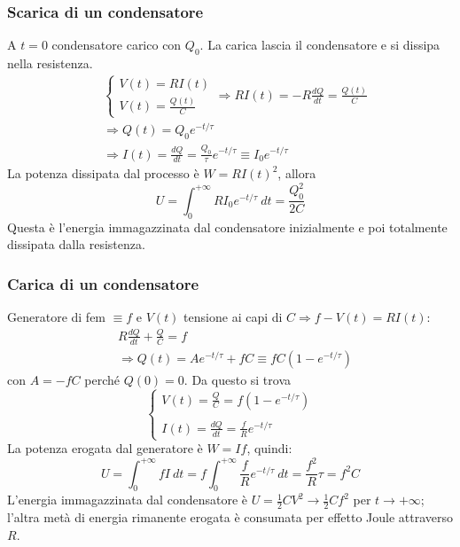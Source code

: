 \documentclass[10pt, a4paper]{scrartcl}
\numberwithin{equation}{subsection}
\theoremstyle{style1}
\begin{document}
\subsubsection{Scarica di un condensatore}
A $t=0$ condensatore carico con $Q_0$. La carica lascia il condensatore e si dissipa nella resistenza. 
\begin{equation}
	\begin{split}
		&\begin{cases}
		V(t) = RI(t) \\
		V(t) = \frac{Q(t)}{C} 
	\end{cases}\Rightarrow RI(t) = - R \frac{d Q}{d t} = \frac{Q(t)}{C}\\
		&\Rightarrow Q(t) = Q_0 e^{ - t / \tau }\\
		&\Rightarrow I(t) = \frac{d Q}{d t}  = \frac{Q_0}{\tau }e^{-t / \tau } \equiv I_0 e^{-t / \tau } 
	\end{split}
\end{equation}
La potenza dissipata dal processo \`e $W = RI(t)^2$, allora
\begin{equation}
	U  = \int_{0} ^{+\infty} RI_0e^{-t / \tau } \ dt  = \frac{Q_0^2}{2C}
\end{equation}
Questa \`e l'energia immagazzinata dal condensatore inizialmente e poi totalmente dissipata dalla resistenza.
\subsubsection{Carica di un condensatore}
Generatore di fem $\equiv f$ e $V(t)$ tensione ai capi di $C\Rightarrow f- V(t) = RI(t)$:
\begin{equation}
	\begin{split}
		&R \frac{d Q}{d t}  + \frac{Q}{C} = f\\
		&\Rightarrow Q(t) = Ae^{-t / \tau } + fC \equiv fC(1- e^{- t / \tau } )
	\end{split}
\end{equation}
con $A=-fC$ perch\'e $Q(0) = 0$. Da questo si trova
\begin{equation}
	\begin{cases}
		\displaystyle V(t) = \frac{Q}{C} = f(1- e^{-t / \tau }) \\
		\\
		\displaystyle I(t) = \frac{d Q}{d t} = \frac{f}{R} e^{-t / \tau } 
	\end{cases}
\end{equation}
La potenza erogata dal generatore \`e $W = If$, quindi:
\begin{equation}
	U = \int_{0} ^{+\infty} fI \ dt = f \int_{0} ^{+\infty} \frac{f}{R}e^{-t / \tau } \ dt = \frac{f^2}{R}\tau  = f^2 C
\end{equation}
L'energia immagazzinata dal condensatore \`e $U = \frac{1}{2}CV^2 \to \frac{1}{2}Cf^2$ per $t\to +\infty$; l'altra met\`a di energia rimanente erogata \`e consumata per effetto Joule attraverso $R$.
\end{document}
